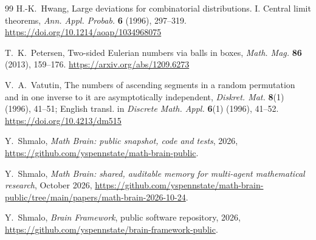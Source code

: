 \documentclass[11pt]{amsart}
\theoremstyle{remark}
\begin{document}
\begin{thebibliography}{99}
H.-K.~Hwang, Large deviations for combinatorial distributions. I. Central limit theorems, \emph{Ann. Appl. Probab.} \textbf{6} (1996), 297--319. \url{https://doi.org/10.1214/aoap/1034968075}

T.~K.~Petersen, Two-sided Eulerian numbers via balls in boxes, \emph{Math. Mag.} \textbf{86} (2013), 159--176. \url{https://arxiv.org/abs/1209.6273}

V.~A.~Vatutin, The numbers of ascending segments in a random permutation and in one inverse to it are asymptotically independent, \emph{Diskret. Mat.} \textbf{8}(1) (1996), 41--51; English transl. in \emph{Discrete Math. Appl.} \textbf{6}(1) (1996), 41--52. \url{https://doi.org/10.4213/dm515}

 Y.~Shmalo, \emph{Math Brain: public snapshot, code and tests}, 2026, \url{https://github.com/yspennstate/math-brain-public}.

 Y.~Shmalo, \emph{Math Brain: shared, auditable memory for multi-agent mathematical research}, October 2026, \url{https://github.com/yspennstate/math-brain-public/tree/main/papers/math-brain-2026-10-24}.

 Y.~Shmalo, \emph{Brain Framework}, public software repository, 2026, \url{https://github.com/yspennstate/brain-framework-public}.

\end{thebibliography}
\end{document}
